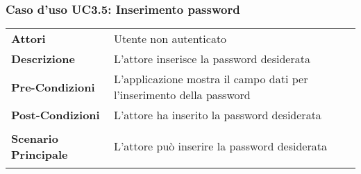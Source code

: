 \subsubsection{Caso d'uso UC3.5: Inserimento password}
\label{UC3_5}

\begin{longtable}{ l | p{11cm}}
	\hline
	\rowcolor{Gray}
	 \multicolumn{2}{c}{UC3.5 - Inserimento password} \\
	 \hline
	\textbf{Attori} & Utente non autenticato \\
	\textbf{Descrizione} & L'attore inserisce la password desiderata  \\
	\textbf{Pre-Condizioni} & L'applicazione mostra il campo dati per l'inserimento della password \\
	\textbf{Post-Condizioni} & L'attore ha inserito la password desiderata \\
	\textbf{Scenario Principale} & \begin{enumerate*}[label=(\arabic*.),itemjoin={\newline}]
		\item L'attore può inserire la password desiderata
	\end{enumerate*}\\
\end{longtable}